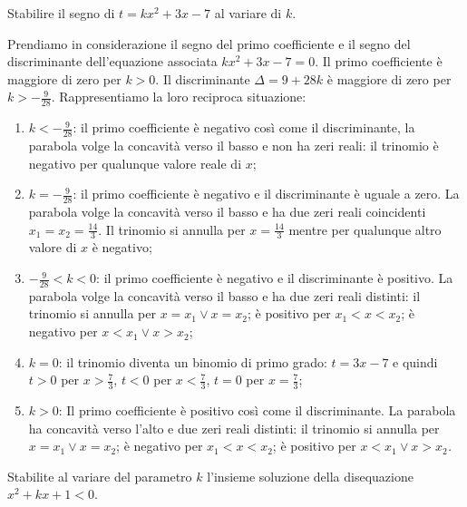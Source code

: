 \begin{exrig}
\begin{esempio}
Stabilire il segno di $t=kx^2+3x-7$ al variare di $ k $.

Prendiamo in considerazione il segno del primo coefficiente e il segno del discriminante dell’equazione associata $kx^2+3x-7=0$. Il primo coefficiente è maggiore di zero per $k>0$. Il discriminante $\Delta =9+28k$ è maggiore di zero per $k>-\frac 9{28}$. Rappresentiamo la loro reciproca situazione:
\begin{center}
 
\end{center}
\begin{enumerate}[label=(\Alph*)]
\item $k<-\frac 9{28}$: il primo coefficiente è negativo così come il discriminante, la parabola volge la concavità verso il basso e non ha zeri reali: il trinomio è negativo per qualunque valore reale di $x$;
\item $k=-\frac 9{28}$: il primo coefficiente è negativo e il discriminante è uguale a zero. La parabola volge la concavità verso il basso e ha due zeri reali coincidenti $x_1=x_2=\frac{14} 3$. Il trinomio si annulla per $x=\frac{14} 3$ mentre per qualunque altro valore di $x$ è negativo;
\item $-\frac 9{28}<k<0$: il primo coefficiente è negativo e il discriminante è positivo. La parabola volge la concavità verso il basso e ha due zeri reali distinti: il trinomio si annulla per $x=x_1\vee x=x_2$; è positivo per $x_1<x<x_2$; è negativo per $x<x_1\vee x>x_2$;
\item $k=0$: il trinomio diventa un binomio di primo grado: $t=3x-7$ e quindi $t>0$ per $x>\frac 7 3$, $t<0$ per $x<\frac 7 3$, $t=0$ per $x=\frac 7 3$;
\item $k>0$: Il primo coefficiente è positivo così come il discriminante. La parabola ha concavità verso l’alto e due zeri reali distinti: il trinomio si annulla per $x=x_1\vee x=x_2$; è negativo per $x_1<x<x_2$; è positivo per $x<x_1\vee x>x_2$\emph{.}
\end{enumerate}
\end{esempio}

\begin{esempio}
Stabilite al variare del parametro $k$ l'insieme soluzione della disequazione $x^2+kx+1<0$.


\end{esempio}
\end{exrig}
